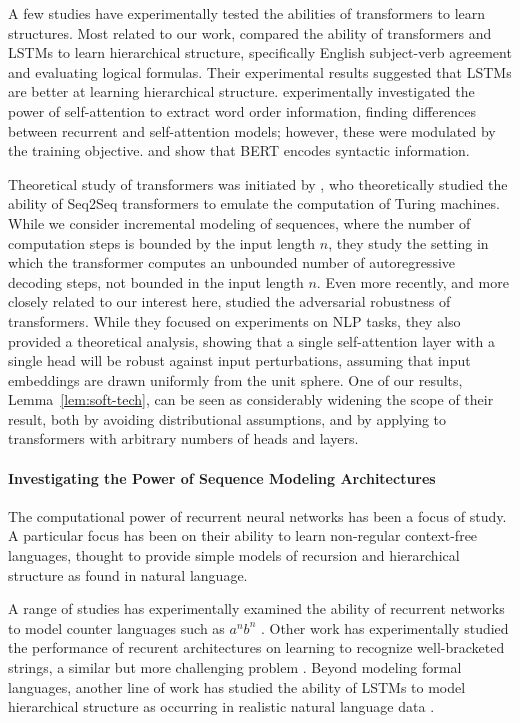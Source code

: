 \documentclass[11pt,a4paper]{article}
\begin{document}
A few studies have experimentally tested the abilities of transformers to learn structures.
Most related to our work, \citet{tran2018importance} compared the ability of transformers and LSTMs to learn hierarchical structure, specifically English subject-verb agreement and evaluating logical formulas.
Their experimental results suggested that LSTMs are better at learning hierarchical structure.
\citet{yang2019assessing} experimentally investigated the power of self-attention to extract word order information, finding differences between recurrent and self-attention models; however, these were modulated by the training objective.
\citet{lin2019open} and \citet{tenney2019bert} show that BERT \cite{devlin2018bert} encodes syntactic information.

Theoretical study of transformers was initiated by \citet{perez2019turing}, who theoretically studied the ability of Seq2Seq transformers to emulate the computation of Turing machines.
While we consider incremental modeling of sequences, where the number of computation steps is bounded by the input length $n$, they study the setting in which the transformer computes an unbounded number of autoregressive decoding steps, not bounded in the input length $n$.
Even more recently, and more closely related to our interest here, \citet{hsieh2019robustness} studied the adversarial robustness of transformers.
While they focused on experiments on NLP tasks, they also provided a theoretical analysis, showing that a single self-attention layer with a single head will be robust against input perturbations, assuming that input embeddings are drawn uniformly from the unit sphere.
One of our results, Lemma~\ref{lem:soft-tech}, can be seen as considerably widening the scope of their result, both by avoiding distributional assumptions, and by applying to transformers with arbitrary numbers of heads and layers.


\paragraph{Investigating the Power of Sequence Modeling Architectures}
The computational power of recurrent neural networks has been a focus of study.
A particular focus has been on their ability to learn non-regular context-free languages, thought to provide simple models of recursion and hierarchical structure as found in natural language.

A range of studies has experimentally examined the ability of recurrent networks to model counter languages such as $a^nb^n$ \cite{kalinke1998computation,gers2001lstm,cartling2008implicit,weiss2018practical,suzgun2019evaluating}.
Other work has experimentally studied the performance of recurent architectures on learning to recognize well-bracketed strings, a similar but more challenging problem \cite{sennhauser2018evaluating,skachkova2018closing,bernardy2018can}.
Beyond modeling formal languages, another line of work has studied the ability of LSTMs to model hierarchical structure as occurring in realistic natural language data \cite{linzen2016assessing,gulordava2018colorless}.
\end{document}
